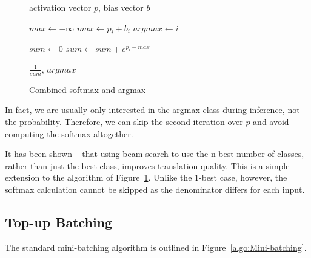 \documentclass[]{article}
\begin{document}
\begin{figure} [h]
\begin{algorithmic}
\REQUIRE activation vector $p$, bias vector $b$


\STATE $max \gets - \infty$ 
    \STATE $max \gets p_i + b_i$
    \STATE $argmax \gets i$
  \ENDIF
\ENDFOR 


\STATE $sum \gets 0$ 
    \STATE $sum \gets sum + e^{p_i - max}$
  \ENDIF
\ENDFOR 

\RETURN $\frac{1}{sum}$, $argmax$ 


\end{algorithmic}
\caption{Combined softmax and argmax}
\label{algo:Fused Kernel}
\end{figure}


In fact, we are usually only interested in the argmax class during inference, not the probability. Therefore, we can skip the second iteration over $p$ and avoid computing the softmax altogether. %

% 
% 
% 
% 

It has been shown ~\citep{koehn-knowles:2017:NMT} that using beam search to use the n-best number of classes, rather than just the best class, improves translation quality. This is a simple extension to the algorithm of Figure~\ref{algo:Fused Kernel}. Unlike the 1-best case, however, the softmax calculation cannot be skipped as the denominator differs for each input.


\subsection{Top-up Batching}

The standard mini-batching algorithm is outlined in Figure~\ref{algo:Mini-batching}.
\end{document}
